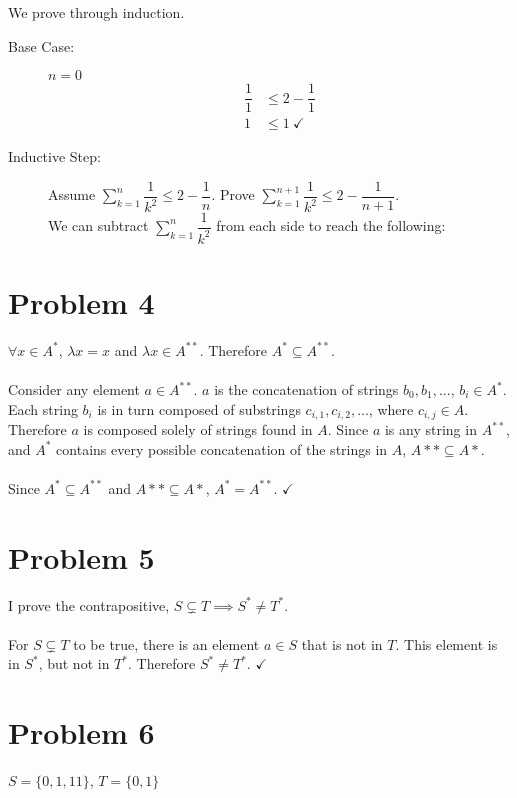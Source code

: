 \documentclass[11pt]{article}
\begin{document}
We prove through induction.
\begin{description}
	\item[Base Case:] $n= 0$
		\begin{align*}
				\dfrac{1}{1} &\leq 2 - \dfrac{1}{1}\\
				1 &\leq 1\ \checkmark
		\end{align*}
		
	\item[Inductive Step:] Assume $\sum\limits_{k=1}^n \dfrac{1}{k^2} \leq 2 - \dfrac{1}{n}$. Prove $\sum\limits_{k=1}^{n+1} \dfrac{1}{k^2} \leq 2 - \dfrac{1}{n+1}$. \\
	We can subtract $\sum\limits_{k=1}^{n} \dfrac{1}{k^2}$ from each side to reach the following:


\end{description}

\section*{Problem 4}

$\forall x \in A^*$, $\lambda x = x$ and $ \lambda x \in A^{**}$. Therefore $A^* \subseteq A^{**}$.\\\\
Consider any element $a \in A^{**}$. $a$ is the concatenation of strings $b_0, b_1,...$, $b_i \in A^*$. Each string $b_i$ is in turn composed of substrings $c_{i,1}, c_{i,2}, ...$, where $c_{i,j} \in A$. Therefore $a$ is composed solely of strings found in $A$. Since $a$ is any string in $A^{**}$, and $A^*$ contains every possible concatenation of the strings in $A$, $A** \subseteq A*$.\\\\
Since $A^* \subseteq A^{**}$ and $A** \subseteq A*$, $A^* = A^{**}$. $\checkmark$

\section*{Problem 5}

I prove the contrapositive, $ S \subsetneq T \implies S^* \neq T^*$.\\\\
For $S \subsetneq T$ to be true, there is an element $a \in S$ that is not in $T$. This element is in $S^*$, but not in $T^*$. Therefore $S^* \neq T^*$. $\checkmark$


\section*{Problem 6}
$ S = \{0, 1, 11\}$, $T = \{0, 1\}$
\end{document}
